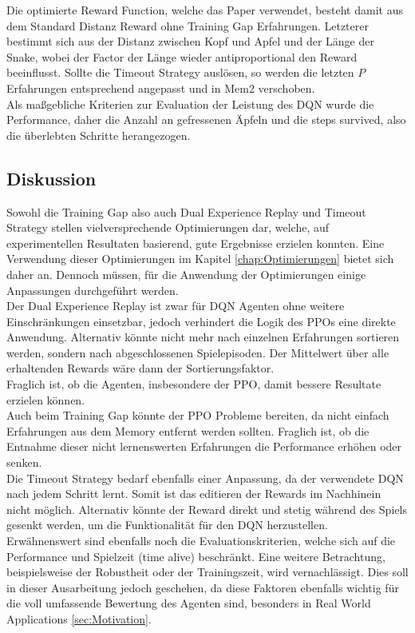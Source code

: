 Die optimierte Reward Function, welche das Paper verwendet, besteht damit aus dem Standard Distanz Reward ohne Training Gap Erfahrungen. Letzterer bestimmt sich aus der Distanz zwischen Kopf und Apfel und der Länge der Snake, wobei der Factor der Länge wieder antiproportional den Reward beeinflusst. Sollte die Timeout Strategy auslösen, so werden die letzten $P$ Erfahrungen entsprechend angepasst und in Mem2 verschoben.\\
Als maßgebliche Kriterien zur Evaluation der Leistung des DQN wurde die Performance, daher die Anzahl an gefressenen Äpfeln und die steps survived, also die überlebten Schritte herangezogen.

\subsection{Diskussion}
Sowohl die Training Gap also auch Dual Experience Replay und Timeout Strategy stellen vielversprechende Optimierungen dar, welche, auf experimentellen Resultaten basierend, gute Ergebnisse erzielen konnten. Eine Verwendung dieser Optimierungen im Kapitel \ref{chap:Optimierungen} bietet sich daher an. Dennoch müssen, für die Anwendung der Optimierungen einige Anpassungen durchgeführt werden.\\
Der Dual Experience Replay ist zwar für DQN Agenten ohne weitere Einschränkungen einsetzbar, jedoch verhindert die Logik des PPOs eine direkte Anwendung. Alternativ könnte nicht mehr nach einzelnen Erfahrungen sortieren werden, sondern nach abgeschlossenen Spielepisoden. Der Mittelwert über alle erhaltenden Rewards wäre dann der Sortierungsfaktor.\\
Fraglich ist, ob die Agenten, insbesondere der PPO, damit bessere Resultate erzielen können.\\
Auch beim Training Gap könnte der PPO Probleme bereiten, da nicht einfach Erfahrungen aus dem Memory entfernt werden sollten. Fraglich ist, ob die Entnahme dieser nicht lernenswerten Erfahrungen die Performance erhöhen oder senken.\\
Die Timeout Strategy bedarf ebenfalls einer Anpassung, da der verwendete DQN nach jedem Schritt lernt. Somit ist das editieren der Rewards im Nachhinein nicht möglich. Alternativ könnte der Reward direkt und stetig während des Spiels gesenkt werden, um die Funktionalität für den DQN herzustellen.\\
Erwähnenswert sind ebenfalls noch die Evaluationskriterien, welche sich auf die Performance und Spielzeit (time alive) beschränkt. Eine weitere Betrachtung, beispielsweise der Robustheit oder der Trainingszeit, wird vernachlässigt. Dies soll in dieser Ausarbeitung jedoch geschehen, da diese Faktoren ebenfalls wichtig für die voll umfassende Bewertung des Agenten sind, besonders in Real World Applications \ref{sec:Motivation}.


